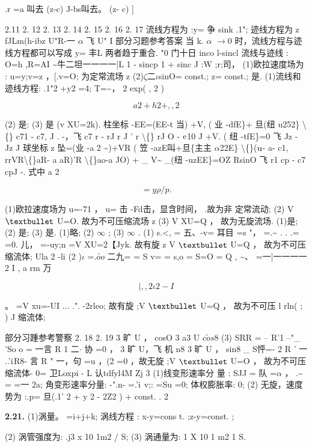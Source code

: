.r =a 叫去 (z-c) J-bs叫去。 (z- c) ]

2.11 2. 12 2. 13 2. 14 2. 15 2. 16 2. 17 流线方程为 :y= 争 sink .1"; 迹线方程为 z fJLm(h-ibz U"R-一 $\alpha$ 飞 U" I 部分习题参考答案 当 k. $\alpha$ $\rightarrow$0 时，流线方程与迹线方程都可以写成 y= 丰L 两者趋于重合. "0 门十日 inco l-sincl 流线与迹线 : O=h ,R=AI \textasciitilde{}牛二坦一一一一|L 1 - sincp 1 + sinc J :W ;r;司， (1)欧拉速度场为 : u=y;v=z ，[.v=O; 为定常流场 z (2)$\zeta$二$\iota$sinO= const.; z= const.; 是. (1)流线和迹线方程: .1"2 +y2 =4; T=\textasciitilde{}， 2 exp( , 2 )

\[a 2 +h2 +,,2\]

(2) 是: (3) 是 (v XU=2k). 柱坐标 -EE=(EE-t 当) +V, ( 业 -dfE\}+ 旦(纽 u252\} \textbackslash\{\} c71 - c7, J . -，飞 c7 r - rJ r J ' r \textbackslash\{\} rJ O - ${\rm e}$10 J +V. ( 纽 -tfE\}=0 飞 Jz - Jz J 球坐标 z 坠=(业 -a 2 \textasciitilde{})+VR ( 笠 -azE叫+旦\{主主 $\alpha$22E\} \textbackslash\{\}(${\rm u}$- a- c1, rrVR\textbackslash\{\}aR- a aR)'R \textbackslash\{\}ao-a JO) + \_ V\textasciitilde{} \_(纽 -uzEE\}=OZ RsinO 飞 r1 cp - c7 cpJ -. 式中 a 2

\[=y\rho  /p.\]

(1)欧拉速度场为 u=-71 ， u= 击 -Fd击，显含时间， .故为非 定常流动; (2) V ${\rm •}$ U=O. 故为不可压缩流场 z (3) V XU=Q ， 故为无旋流场. (1)是; (2) 是; (3) 是. (1)略; (2) $\infty$ ; (3) $\infty$ . (1) s.<, = 五、-v= 耳目 =s "， =.\textasciitilde{} . . .= =0. 儿， =-uy;n =V XU=2【Jyk. 故有旋 z V ${\rm •}$ U=Q ， 故为不可压缩流体; Ula 2 -li (2 )$\iota$ =.$\tilde{oo}$ 二九= = S v= = s,o = S=O = Q , \textasciitilde{}、 =一|一一一一 2 I , a rm 万

\[|, ,  2\iota 2 - I\]

。 =V xu=-UI ... .". -2rleo; 故有旋 ;V ${\rm •}$ U=Q ， 故为不可压 l rln( ; ) J 缩流体;

部分习踵参考警察 2. 18 2. 19 3 旷 U ， cosO 3 a3 U $\tilde{cos}$8 (3) SRR = -- R'1 --"\_ 'So o = 一言 R 1 二$\cdot $ 协 =0 ， 3 旷 U，飞 机 n8 3 旷 U ， sin8 \_ S怦=- 2 R ' 一 ..'${\rm i}$R8- 言 R " 一，句 =u ，(2 =0 ，故无旋 ;V ${\rm •}$ U=O ， 故为不可压缩流体- 0= 卫Loxpi - L 认tdfyl4M Zj 3 (1)线变形速率分 量 : SJJ = 队 =$\alpha$ ， .\textasciitilde{} = =一 2a; 角变形速率分量: -".n- =.'${\rm i}$ v;: =Su =0; 体权膨胀率: 0; (2) 无旋，速度势为 :.p= 旦(.1' 2 + y 2 - 2Z2 ) + const. . 2

\noindent\textbf{2.21.} (1)涡量。 =i+j+k; 涡线方程 : x-y=cons t. ;z-y=const. ;

(2) 涡管强度为: .j3 x 10 1m2 / S; (3) 涡通量为: 1 X 10 1 m2 1 S.

